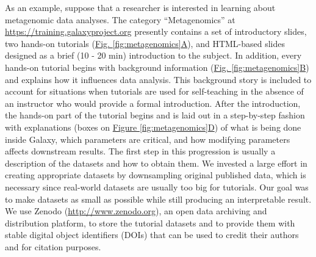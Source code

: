 As an example, suppose that a researcher is interested in learning about metagenomic data analyses. The category “Metagenomics” at  \url{https://training.galaxyproject.org} presently contains a set of introductory slides, two hands-on tutorials (\hyperref[fig:metagenomics]{Fig. \ref{fig:metagenomics}A}), and HTML-based slides designed as a brief (10 - 20 min) introduction to the subject. In addition, every hands-on tutorial begins with background information (\hyperref[fig:metagenomics]{Fig. \ref{fig:metagenomics}B}) and explains how it influences data analysis. This background story is included to account for situations when tutorials are used for self-teaching in the absence of an instructor who would provide a formal introduction. After the introduction, the hands-on part of the tutorial begins and is laid out in a step-by-step fashion with explanations (boxes on \hyperref[fig:metagenomics]{Figure \ref{fig:metagenomics}D}) of what is being done inside Galaxy, which parameters are critical, and how modifying parameters affects downstream results. The first step in this progression is usually a description of the datasets and how to obtain them. We invested a large effort in creating appropriate datasets by downsampling original published data, which is necessary since real-world datasets are usually too big for tutorials. Our goal was to make datasets as small as possible while still producing an interpretable result. We use Zenodo (\url{http://www.zenodo.org}), an open data archiving and distribution platform, to store the tutorial datasets and to provide them with stable digital object identifiers (DOIs) that can be used to credit their authors and for citation purposes.

